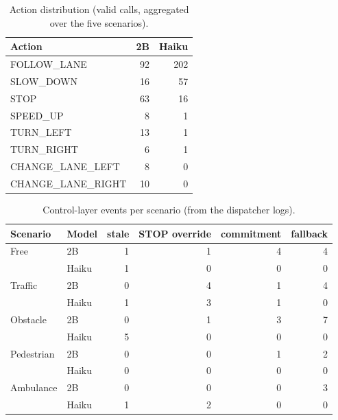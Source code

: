 \begin{table}[ht]
\centering
\caption{Action distribution (valid calls, aggregated over the five scenarios).}
\label{tab:actions}
\begin{tabular}{lrr}
\toprule
Action & 2B & Haiku \\
\midrule
FOLLOW\_LANE & 92 & 202 \\
SLOW\_DOWN & 16 & 57 \\
STOP & 63 & 16 \\
SPEED\_UP & 8 & 1 \\
TURN\_LEFT & 13 & 1 \\
TURN\_RIGHT & 6 & 1 \\
CHANGE\_LANE\_LEFT & 8 & 0 \\
CHANGE\_LANE\_RIGHT & 10 & 0 \\
\bottomrule
\end{tabular}
\end{table}

\begin{table}[ht]
\centering
\caption{Control-layer events per scenario (from the dispatcher logs).}
\label{tab:control-events}
\begin{tabular}{llrrrr}
\toprule
Scenario & Model & stale & STOP override & commitment & fallback \\
\midrule
Free & 2B & 1 & 1 & 4 & 4 \\
 & Haiku & 1 & 0 & 0 & 0 \\
\addlinespace
Traffic & 2B & 0 & 4 & 1 & 4 \\
 & Haiku & 1 & 3 & 1 & 0 \\
\addlinespace
Obstacle & 2B & 0 & 1 & 3 & 7 \\
 & Haiku & 5 & 0 & 0 & 0 \\
\addlinespace
Pedestrian & 2B & 0 & 0 & 1 & 2 \\
 & Haiku & 0 & 0 & 0 & 0 \\
\addlinespace
Ambulance & 2B & 0 & 0 & 0 & 3 \\
 & Haiku & 1 & 2 & 0 & 0 \\
\bottomrule
\end{tabular}
\end{table}
